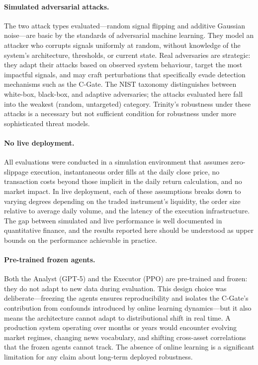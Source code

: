 \paragraph{Simulated adversarial attacks.}
The two attack types evaluated---random signal flipping and additive Gaussian
noise---are basic by the standards of adversarial machine learning. They model
an attacker who corrupts signals uniformly at random, without knowledge of the
system's architecture, thresholds, or current state. Real adversaries are
strategic: they adapt their attacks based on observed system behaviour, target
the most impactful signals, and may craft perturbations that specifically evade
detection mechanisms such as the C-Gate. The NIST taxonomy
\cite{vassilev2023nist} distinguishes between white-box, black-box, and
adaptive adversaries; the attacks evaluated here fall into the weakest
(random, untargeted) category. Trinity's robustness under these attacks is a
necessary but not sufficient condition for robustness under more sophisticated
threat models.

\paragraph{No live deployment.}
All evaluations were conducted in a simulation environment that assumes
zero-slippage execution, instantaneous order fills at the daily close price,
no transaction costs beyond those implicit in the daily return calculation,
and no market impact. In live deployment, each of these assumptions breaks
down to varying degrees depending on the traded instrument's liquidity,
the order size relative to average daily volume, and the latency of the
execution infrastructure. The gap between simulated and live performance is
well documented in quantitative finance, and the results reported here should
be understood as upper bounds on the performance achievable in practice.

\paragraph{Pre-trained frozen agents.}
Both the Analyst (GPT-5) and the Executor (PPO) are pre-trained and frozen:
they do not adapt to new data during evaluation. This design choice was
deliberate---freezing the agents ensures reproducibility and isolates the
C-Gate's contribution from confounds introduced by online learning dynamics---but
it also means the architecture cannot adapt to distributional shift in
real time. A production system operating over months or years would encounter
evolving market regimes, changing news vocabulary, and shifting cross-asset
correlations that the frozen agents cannot track. The absence of online
learning is a significant limitation for any claim about long-term deployed
robustness.

